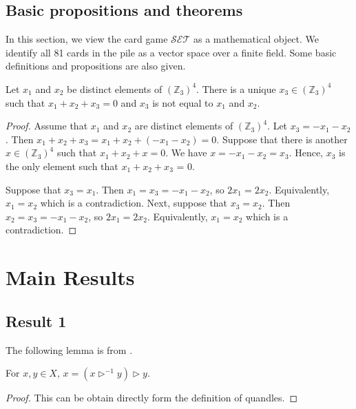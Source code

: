 \documentclass[ma491]{swumath}
\begin{document}
\section{Basic propositions and theorems}
In this section, we view the card game $\mathcal{SET}$ as a mathematical object. We identify all 81 cards in the pile as a vector space over a finite field. Some basic definitions and propositions are also given.

\begin{proposition} Let $x_1$ and $x_2$ be distinct elements of $(\mathbb{Z}_3)^4$. There is a unique $x_3 \in (\mathbb{Z}_3)^4$ such that $x_1+ x_2+ x_3 = 0$ and $x_3$ is not equal to $x_1$ and $x_2$.
\end{proposition}
\begin{proof} Assume that $x_1$ and $x_2$ are distinct elements of $(\mathbb{Z}_3)^4$. Let $x_3 = -x_1-x_2$. Then $x_1+ x_2+ x_3 = x_1+ x_2+ (-x_1-x_2) = 0.$ Suppose that there is another $x \in (\mathbb{Z}_3)^4$ such that $x_1+ x_2+ x = 0$. We have $x = -x_1-x_2 = x_3$. Hence, $x_3$ is the only element such that $x_1+ x_2+ x_3$ = 0.

Suppose that $x_3 = x_1$. Then $x_1 = x_3 = -x_1-x_2$, so $2x_1 = 2x_2$. Equivalently, $x_1 = x_2$ which is a contradiction. Next, suppose that $x_3 = x_2$. Then $x_2  = x_3 =-x_1-x_2$, so $2x_1= 2x_2$. Equivalently, $x_1 = x_2$ which is a contradiction. 
 \end{proof}

\chapter{Main Results}

\section{Result 1}
The following lemma is from \cite{davis}.
\begin{lemma}
	For $x, y \in X$, $x=(x \vartriangleright^{-1} y)\vartriangleright y$.
\end{lemma}
\begin{proof}
	This can be obtain directly form the definition of quandles.
\end{proof}
\end{document}
